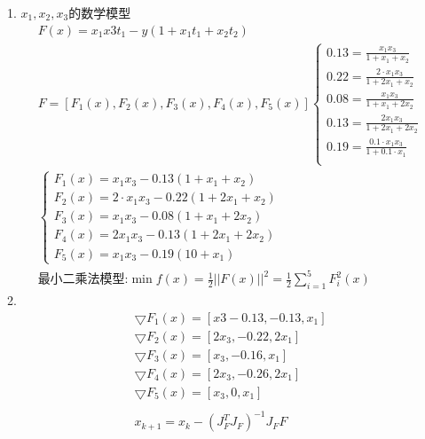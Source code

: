 \documentclass{article}
\begin{document}
    1. $x_1, x_2, x_3$的数学模型\\
    \begin{gather*}
        F(x) = x_1x3t_1 - y(1 + x_1t_1 + x_2t_2)\\
        F = [F_1(x), F_2(x), F_3(x), F_4(x), F_5(x)]
        \begin{cases}
            0.13 = \frac{x_1x_3}{1 + x_1 + x_2}\\
            0.22 = \frac{2 \cdot x_1 x_3}{1 + 2x_1 + x_2}\\
            0.08 = \frac{x_1x_3}{1 + x_1 + 2x_2}\\
            0.13 = \frac{2x_1x_3}{1 + 2x_1 + 2x_2}\\
            0.19 = \frac{0.1 \cdot x_1 x_3}{1 + 0.1 \cdot x_1}\\
        \end{cases}\\
        \begin{cases}
            F_1(x) = x_1x_3 - 0.13(1 + x_1 + x_2)\\
            F_2(x) = 2 \cdot x_1 x_3 - 0.22(1 + 2x_1 + x_2)\\
            F_3(x) = x_1x_3 - 0.08(1 + x_1 + 2x_2)\\
            F_4(x) = 2x_1x_3 - 0.13(1 + 2x_1 + 2x_2)\\
            F_5(x) = x_1x_3 - 0.19(10 + x_1)
        \end{cases}\\
        \text{最小二乘法模型:}\min f(x) = \frac{1}{2}||F(x)||^2 
                                       = \frac{1}{2} \sum_{i=1}^{5}F^2_i(x)
    \end{gather*}
    2. 
    \begin{gather*}
        \bigtriangledown F_1(x) = [x3 - 0.13, -0.13, x_1]\\
        \bigtriangledown F_2(x) = [2 x_3, -0.22, 2x_1]\\
        \bigtriangledown F_3(x) = [x_3, -0.16, x_1]\\
        \bigtriangledown F_4(x) = [2x_3, -0.26, 2x_1]\\
        \bigtriangledown F_5(x) = [x_3, 0, x_1]\\
        \\
        x_{k+1} = x_k - (J^T_FJ_F)^{-1}J_FF
    \end{gather*}
\end{document}
